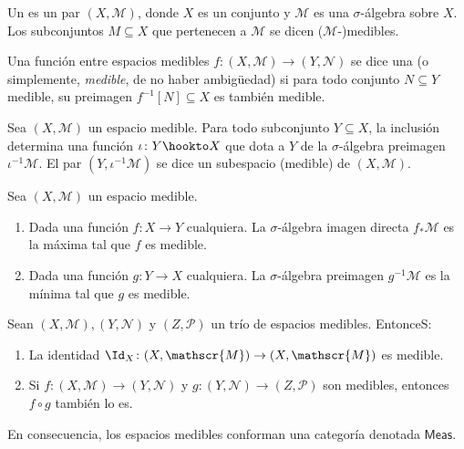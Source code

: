 \begin{mydef}
	Un  es un par $(X, \mathscr{M})$,
	donde $X$ es un conjunto y $\mathscr{M}$ es una $\sigma$-álgebra sobre $X$.
	Los subconjuntos $M \subseteq X$ que pertenecen a $\mathscr{M}$ se dicen ($\mathscr{M}$-)medibles.

	Una función entre espacios medibles $f \colon (X, \mathscr{M}) \to (Y, \mathscr{N})$
	se dice una 
	(o simplemente, \textit{medible}, de no haber ambigüedad)
	si para todo conjunto $N \subseteq Y$ medible, su preimagen $f^{-1}[N] \subseteq X$ es también medible.
\end{mydef}
\begin{ex}
	Sea $(X, \mathscr{M})$ un espacio medible.
	Para todo subconjunto $Y \subseteq X$, la inclusión determina una función $\iota \colon Y \hookto X$
	que dota a $Y$ de la $\sigma$-álgebra preimagen $\iota^{-1}\mathscr{M}$.
	El par $(Y, \iota^{-1}\mathscr{M})$ se dice un subespacio (medible) de $(X, \mathscr{M})$.
\end{ex}

\begin{cor}
	Sea $(X, \mathscr{M})$ un espacio medible.
	\begin{enumerate}
		\item Dada una función $f \colon X \to Y$ cualquiera.
			La $\sigma$-álgebra imagen directa $f_*\mathscr{M}$ es la máxima tal que $f$ es medible.
		\item Dada una función $g \colon Y \to X$ cualquiera.
			La $\sigma$-álgebra preimagen $g^{-1}\mathscr{M}$ es la mínima tal que $g$ es medible.
	\end{enumerate}
\end{cor}

\begin{prop}
	Sean $(X, \mathscr{M}), (Y, \mathscr{N})$ y $(Z, \mathscr{P})$ un trío de espacios medibles.
	EntonceS:
	\begin{enumerate}
		\item La identidad $\Id_X \colon (X, \mathscr{M}) \to (X, \mathscr{M})$ es medible.
		\item Si $f \colon (X, \mathscr{M}) \to (Y, \mathscr{N})$ y $g \colon (Y, \mathscr{N}) \to (Z, \mathscr{P})$ son medibles,
			entonces $f\circ g$ también lo es.
	\end{enumerate}
	En consecuencia, los espacios medibles conforman una categoría denotada $\mathsf{Meas}$.
\end{prop}

